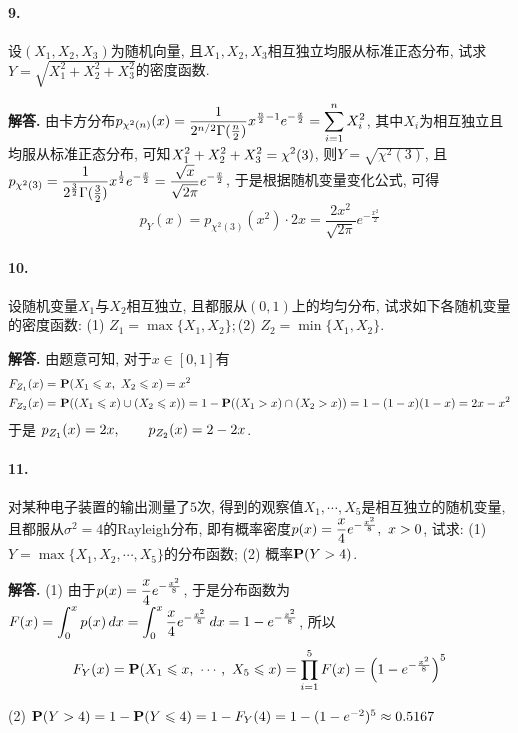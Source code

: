 \documentclass[12pt, a4paper, oneside]{ctexart}
\newenvironment{solution}{\par\noindent\textbf{解答. }}{\bigskip\par}
\begin{document}
\paragraph{9.}设$(X_1,X_2,X_3)$为随机向量, 且$X_1,X_2,X_3$相互独立均服从标准正态分布, 试求\\$Y=\sqrt{X_1^2+X_2^2+X_3^2}$的密度函数.
\begin{solution}
    由卡方分布$\disp p_{\chi^2(n)}(x) = \frac{1}{2^{n/2}\Gamma(\frac{n}{2})}x^{\frac{n}{2}-1}e^{-\frac{x}{2}}=\sum_{i=1}^nX_i^2$, 其中$X_i$为相互独立且均服从标准正态分布, 可知$\disp X_1^2+X_2^2+X_3^2=\chi^2(3)$, 则$Y = \sqrt{\chi^2(3)}$, 且$\disp p_{\chi^2(3)}=\frac{1}{2^{\frac{3}{2}}\Gamma(\frac{3}{2})}x^{\frac{1}{2}}e^{-\frac{x}{2}}=\frac{\sqrt{x}}{\sqrt{2\pi}}e^{-\frac{x}{2}}$, 于是根据随机变量变化公式, 可得
    \begin{equation*}
        p_Y(x) = p_{\chi^2(3)}(x^2)\cdot 2x = \frac{2x^2}{\sqrt{2\pi}}e^{-\frac{x^2}{2}}
    \end{equation*}
\end{solution}
\paragraph{10.}设随机变量$X_1$与$X_2$相互独立, 且都服从$(0,1)$上的均匀分布, 试求如下各随机变量的密度函数: (1) $Z_1=\max\{X_1,X_2\};$\quad (2) $Z_2 = \min\{X_1,X_2\}$.
\begin{solution}
    由题意可知, 对于$x\in [0,1]$有
    \begin{equation*}
        \begin{aligned}
        F_{Z_1}(x) =&\ \P(X_1\leqslant x,\ X_2\leqslant x) = x^2 \\
        F_{Z_2}(x) =&\ \P((X_1\leqslant x)\cup(X_2\leqslant x)) = 1-\P((X_1 > x)\cap(X_2 > x)) = 1-(1-x)(1-x) = 2x-x^2
        \end{aligned}
    \end{equation*}
    于是 $\disp p_{Z_1}(x) = 2x,\qquad p_{Z_2}(x) = 2-2x$.
\end{solution}
\paragraph{11.}对某种电子装置的输出测量了$5$次, 得到的观察值$X_1,\cdots,X_5$是相互独立的随机变量, 且都服从$\sigma^2=4$的Rayleigh分布, 即有概率密度$\disp p(x) = \frac{x}{4}e^{-\frac{x^2}{8}},\ x > 0$, 试求: (1)$Y=\max\{X_1,X_2,\cdots,X_5\}$的分布函数; (2) 概率$\P(Y>4)$.
\begin{solution}
    (1) 由于$\disp p(x) = \frac{x}{4}e^{-\frac{x^2}{8}}$, 于是分布函数为$\disp F(x) = \int_0^xp(x)\,dx = \int_0^x\frac{x}{4}e^{-\frac{x^2}{8}}\,dx = 1-e^{-\frac{x^2}{8}}$, 所以
    \begin{equation*}
        F_{Y}(x) = \P(X_1\leqslant x,\ \cdots,\ X_5\leqslant x)=\prod_{i=1}^5F(x) = \left(1-e^{-\frac{x^2}{8}}\right)^5
    \end{equation*}
    
    (2) $\P(Y > 4) = 1-\P(Y\leqslant 4) = 1-F_{Y}(4) = 1-(1-e^{-2})^5\approx 0.5167$
\end{solution}
\end{document}
